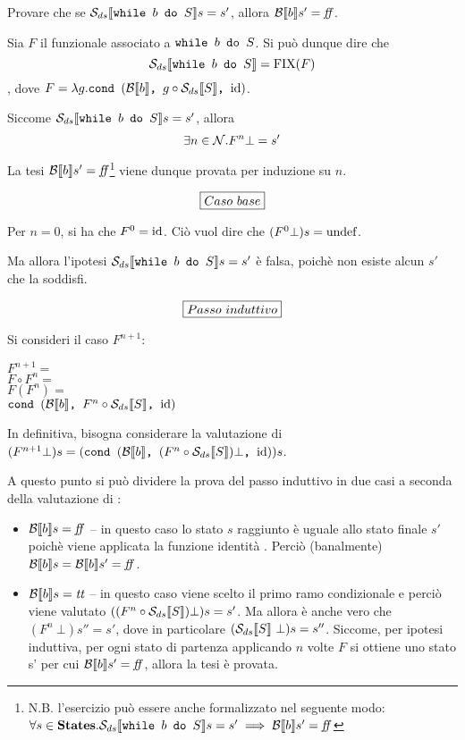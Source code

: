{
  Provare che se $\dsCtxt{\wbS{b}{S}} s = s'$, allora $\B{b}' = \semfalse$.
}
{
}

Sia $F$ il funzionale associato a $\wbS{b}{S}$. Si può dunque dire che
$$
\dsCtxt{\wbS{b}{S}} = \fixp{F}
$$
, dove $F = \lambda{g}.\cond{b}{g \circ \dsCtxt{S}}{\idDS}$.

Siccome $\dsCtxt{\wbS{b}{S}} s = s'$, allora
$$
\exists{n}\in\Ncal. F^n \bot = s'
$$

La tesi $\B{b}' = \semfalse$\footnote{N.B. l'esercizio può essere anche
formalizzato nel seguente modo:
$\forall{s\in\states}.\dsCtxt{\wbS{b}{S}} s = s' \implies \B{b}' = \semfalse$} viene dunque provata per induzione su $n$.

$$
\boxer{Caso\ base}
$$

Per $n = 0$, si ha che $F^0 = \idDS$. Ciò vuol dire che
$(F^0 \bot) s = \undefDS$.

Ma allora l'ipotesi $\dsCtxt{\wbS{b}{S}} s = s'$ è falsa,
poichè non esiste alcun $s'$ che la soddisfi.

$$
\boxer{Passo\ induttivo}
$$

Si consideri il caso $F^{n+1}$:
\vspace{.5em}

\noindent $F^{n+1} =$ \\
\noindent $F \circ F^n =$ \\
\noindent $F(F^n) =$ \\
\noindent $\cond{b}{F^n \circ \dsCtxt{S}}{\idDS}$
\vspace{.5em}

In definitiva, bisogna considerare la valutazione di
$(F^{n+1} \bot) s = (\cond{b}{(F^n \circ \dsCtxt{S}) \bot}{\idDS}) s$.

A questo punto si può dividere la prova del passo induttivo in due casi a
seconda della valutazione di :
\begin{itemize}
  \item $\B{b} = \semfalse$ -- in questo caso lo stato $s$ raggiunto è uguale
    allo stato finale $s'$ poichè viene applicata la funzione identità \idDS{}.
    Perciò (banalmente) $\B{b} = \B{b}' = \semfalse$.
  \item $\B{b} = \semtrue$ -- in questo caso viene scelto il primo ramo
    condizionale e perciò viene valutato $((F^n \circ \dsCtxt{S}) \bot) s = s'$.
    Ma allora è anche vero che $(F^n\ \bot) s'' = s'$, dove in particolare
    $(\dsCtxt{S}\ \bot) s = s''$. Siccome, per ipotesi induttiva,
    per ogni stato di partenza applicando $n$ volte $F$ si ottiene uno stato s'
    per cui $\B{b}' = \semfalse$, allora la tesi è provata.
\end{itemize}
